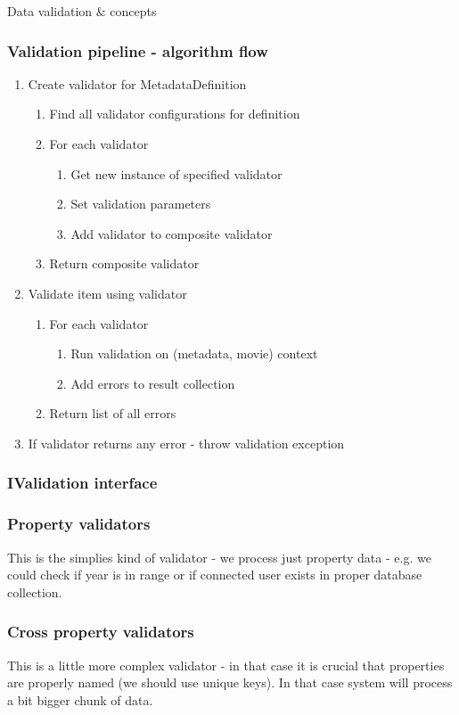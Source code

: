 \documentclass{beamer}
\begin{document}
\begin{section}{Data validation \& concepts}
\begin{frame}
\frametitle{Validation pipeline - algorithm flow}
\begin{enumerate}
	\item Create validator for MetadataDefinition
		\begin{enumerate}
			\item Find all validator configurations for definition
			\item For each validator
				\begin{enumerate}
					\item Get new instance of specified validator
					\item Set validation parameters
					\item Add validator to composite validator
				\end{enumerate}
			\item Return composite validator
		\end{enumerate}
	\item Validate item using validator
		\begin{enumerate}
			\item For each validator
				\begin{enumerate}
					\item Run validation on (metadata, movie) context
					\item Add errors to result collection
				\end{enumerate}
			\item Return list of all errors
		\end{enumerate}
	\item If validator returns any error - throw validation exception
\end{enumerate}
\end{frame}

\begin{frame}
\frametitle{IValidation interface}



\end{frame}

\begin{frame}
\frametitle{Property validators}
This is the simplies kind of validator - we process just property data - e.g. we could check if year is in range or if connected user exists in proper database collection.
\end{frame}

\begin{frame}
\frametitle{Cross property validators}
This is a little more complex validator - in that case it is crucial that properties are properly named (we should use unique keys). In that case system will process a bit bigger chunk of data.


\end{frame}
\end{section}
\end{document}
